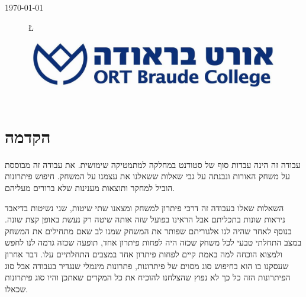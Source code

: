 \documentclass[12pt,twoside]{article}
\begin{document}
\begin{titlepage}
{\large \today}\\[2cm] %
\begin{figure}
	\begin{center}
		\L{\includegraphics[scale=0.3]{images/Braude_Logo.jpg}}
	\end{center}
\end{figure}


\vfill %

\end{titlepage}
\tableofcontents

\newpage
\section{הקדמה}
עבודה זה הינה עבדות סוף של סטודנט במחלקה למתמטיקה שימושית.
את עבודה זה 
מבוססת על משחק האורות 
ונבנתה 
על  גבי שאלות ששאלנו את עצמנו על המשחק.
חיפוש פיתרונות הוביל למחקר ותוצאות מענינות 
שלא ברורים מעליהם.

השאלות שאלו בעבודה זה דרכי פיתרון למשחק 
ומצאנו שתי שיטות, שני נשיטות בדיאבד ניראות שונות בתכליתם אבל הראינו
בפועל שזה אותה שיטה רק נעשת באופן קצת שונה.
בנוסף 
לאחר שהיה לנו אלגוריתם שפותר את המשחק שמנו לב שאם מתחילים את המשחק 
במצב התחלתי טבעי לכל משחק שכזה היה לפחות פיתרון אחד,
תופעה שכזה גרמה לנו לחפש ולמצוא הוכחה למה  באמת קיים לפחות פיתרון אחד במצבים התחלתיים עלו.
דבר אחרון שעסקנו בו הוא בחיפוש סוג מסוים של פיתרונות, פתרונות מינמלי שנגדיר בעבודה אבל 
סוג הפיתרונות הזה כל כך לא נפוץ שהצלחנו להוכיח את כל המקרים 
שאתכן והיו סוג פיתרונות שכאלו.
\end{document}
